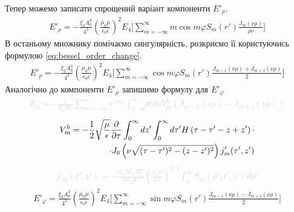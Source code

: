 %
Тепер можемо записати спрощений варіант 
компоненти $ E'_\rho $.
%
\begin{equation*} \begin{aligned}
E'_\rho = - \frac{\xi_3 A_0^3}{4^3}
\left( \frac{\mu_0 \mu} {\epsilon_0 \epsilon} \right)^2
E_4 \Big[ \sum_{m=-\infty}^\infty m \cos m \varphi 
S_m (r') \frac{J_m(\nu \rho)}{\rho \nu} \Big]
\end{aligned} \end{equation*}
%
В останьому множнику помічаємо сингулярність, розкриємо її користуючись
формулою \eqref{eq:bessel_order_change}.
%
\begin{equation*} \begin{aligned}
E'_\rho = - \frac{\xi_3 A_0^3}{4^3}
\left( \frac{\mu_0 \mu} {\epsilon_0 \epsilon} \right)^2
E_4 \Big[ \sum_{m=-\infty}^\infty \cos m \varphi 
S_m (r') \frac{J_{m-1}(\nu \rho) + J_{m+1}(\nu \rho)}{2} \Big]
\end{aligned} \end{equation*}
%
Аналогічно до компоненти $ E'_\rho $ запишимо формулу для $ E'_\varphi $
%
\textcolor{lightgray} { \begin{equation*} \begin{aligned}
E_\varphi = - \frac{1}{2 \sqrt{\epsilon_0}} \sum_{m=-\infty}^{\infty} 
e^{im\varphi} \int_{0}^{\infty} \sqrt{\nu} d \nu 
V_m^h \left( J_{m-1} (\nu \rho) - J_{m+1} (\nu \rho) \right)
\end{aligned} \end{equation*} }
%
\textcolor{lightgray} { \begin{equation*} \begin{aligned} 
V_m^h = - \frac{1}{2} \sqrt{\frac{\mu}{\epsilon}} \frac{\partial }{\partial \tau} 
\int_0^\infty dz' \int_0^\infty d \tau'
H \left( \tau - \tau' - z + z' \right) \cdot \\
\cdot J_0 \left( \nu \sqrt{(\tau-\tau')^2 - (z-z')^2} \right) j'_m (\tau',z')
\end{aligned} \end{equation*} }
%
\textcolor{lightgray} { \begin{equation*} \begin{aligned}
j'_m (t',z') =  - \frac{i \xi_3 A_0^3 \sqrt{\mu_0}}{64 \sqrt{\nu}}
\left( \frac{\mu_0 \mu} {\epsilon_0 \epsilon} \right)^{3/2}
\int_{0}^{\infty} S_m (\rho',t',z') d \rho'
\end{aligned} \end{equation*} }
%
\begin{equation*} \begin{aligned}
E'_\varphi = \frac{\xi_3 A_0^3}{4^3}
\left( \frac{\mu_0 \mu} {\epsilon_0 \epsilon} \right)^2
E_4 \Big[ \sum_{m=-\infty}^\infty 
\sin m \varphi S_m (r')
\frac{J_{m-1}(\nu \rho) - J_{m+1}(\nu \rho)}{2} \Big]
\end{aligned} \end{equation*}

